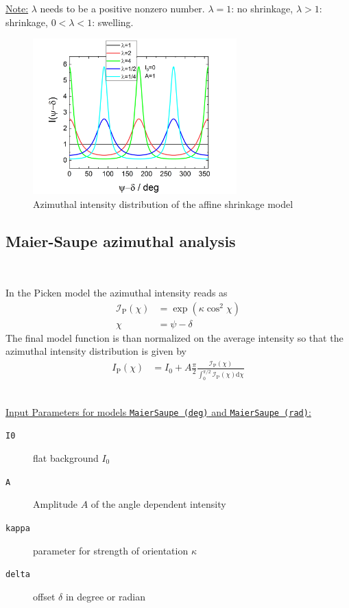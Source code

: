 \noindent \underline{Note:}
$\lambda$ needs to be a positive nonzero number. $\lambda=1$: no shrinkage, $\lambda>1$: shrinkage, $0<\lambda<1$: swelling.


\begin{figure}[htb]
\begin{center}
\includegraphics[width=0.7\textwidth]{../images/form_factor/azimuthal/affine_shrinkage.png}
\end{center}
\caption{Azimuthal intensity distribution of the affine shrinkage model}
\label{fig:affineshrinkage}
\end{figure}

\newpage
\subsection{Maier-Saupe azimuthal analysis} ~\\
\label{sec:Picken}

In the Picken model \cite{Picken1990,Fan1994,Makarova2013} the azimuthal intensity reads as
\begin{align}
  \mathcal{I}_\mathrm{P}(\chi) &= \exp\left(\kappa\cos^2\chi\right)\\
\chi &= \psi-\delta
\end{align}
The final model function is than normalized on the average intensity so that the azimuthal intensity distribution is given by
\begin{align}
  I_\mathrm{P}(\chi) &= I_0 + A \frac{\pi}{2}\frac{\mathcal{I}_\mathrm{P}(\chi)}{\int_0^{\pi/2}\mathcal{I}_\mathrm{P}(\chi)\mathrm{d}\chi}
\end{align}

\hspace{1pt}\\
\underline{Input Parameters for models \texttt{MaierSaupe (deg)} and \texttt{MaierSaupe (rad)}:}\\
\begin{description}
\item[\texttt{I0}] flat background $I_0$
\item[\texttt{A}] Amplitude $A$ of the angle dependent intensity
\item[\texttt{kappa}] parameter for strength of orientation $\kappa$
\item[\texttt{delta}] offset $\delta$ in degree or radian
\end{description}

